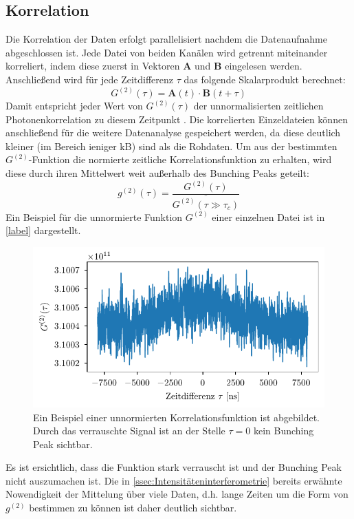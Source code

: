 \subsection{Korrelation}
\label{ssec:Korrelation}
Die Korrelation der Daten erfolgt parallelisiert nachdem die Datenaufnahme abgeschlossen ist. 
Jede Datei von beiden Kanälen wird getrennt miteinander korreliert, indem diese zuerst in Vektoren $\mathbf{A}$ und $\mathbf{B}$ eingelesen werden. 
Anschließend wird für jede Zeitdifferenz $\tau$ das folgende Skalarprodukt berechnet: 
\begin{equation}
    G^{(2)}(\tau) = \mathbf{A}(t)\cdot\mathbf{B}(t+\tau)
\end{equation}
Damit entspricht jeder Wert von $G^{(2)}(\tau)$ der unnormalisierten zeitlichen Photonenkorrelation zu diesem Zeitpunkt \cite{zmijaOpticalIntensityInterferometry2021}. 
Die korrelierten Einzeldateien können anschließend für die weitere Datenanalyse gespeichert werden, da diese deutlich kleiner (im Bereich ieniger kB) sind als die Rohdaten. 
Um aus der bestimmten $G^{(2)}$-Funktion die normierte zeitliche Korrelationsfunktion zu erhalten, wird diese durch ihren Mittelwert weit außerhalb des Bunching Peaks geteilt:
\begin{equation}
    g^{(2)}(\tau) = \frac{G^{(2)}(\tau)}{\overline{G^{(2)}(\tau\gg\tau_c)}}
\end{equation}
Ein Beispiel für die unnormierte Funktion $G^{(2)}$ einer einzelnen Datei ist in \autoref{label} dargestellt. 
\begin{figure}[htbp]
    \centering
    \includegraphics{images/Datenaufnahme/G2.pdf}
    \caption{Ein Beispiel einer unnormierten Korrelationsfunktion ist abgebildet. Durch das verrauschte Signal ist an der Stelle $\tau=0$ kein Bunching Peak sichtbar.}
    \label{fig:G2(tau)}
\end{figure}
Es ist ersichtlich, dass die Funktion stark verrauscht ist und der Bunching Peak nicht auszumachen ist. 
Die in \autoref{ssec:Intensitäteninterferometrie} bereits erwähnte Nowendigkeit der Mittelung über viele Daten, d.h. lange Zeiten um die Form von $g^{(2)}$ bestimmen zu können ist daher deutlich sichtbar. 


